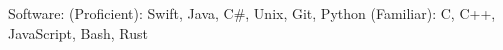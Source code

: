 





\vspace{-4mm}
  \cventry
    {} %
    {} %
    {} %
    {} %
    {
      \begin{cvitems} %
        \item {Software: (Proficient): Swift, Java, C\#, Unix, Git, Python (Familiar): C, C++, JavaScript, Bash, Rust}
      \end{cvitems}
    }


